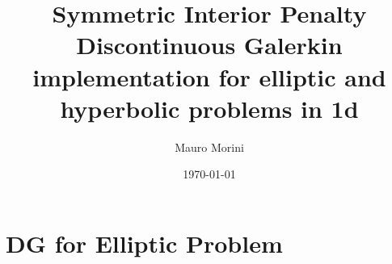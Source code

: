 \documentclass[12pt]{report}   %
\title{Symmetric Interior Penalty Discontinuous Galerkin implementation for elliptic and hyperbolic problems in 1d}
\author{Mauro Morini}
\date{\today}
\begin{document}
\maketitle
\tableofcontents



\chapter{DG for Elliptic Problem}




\end{document}

